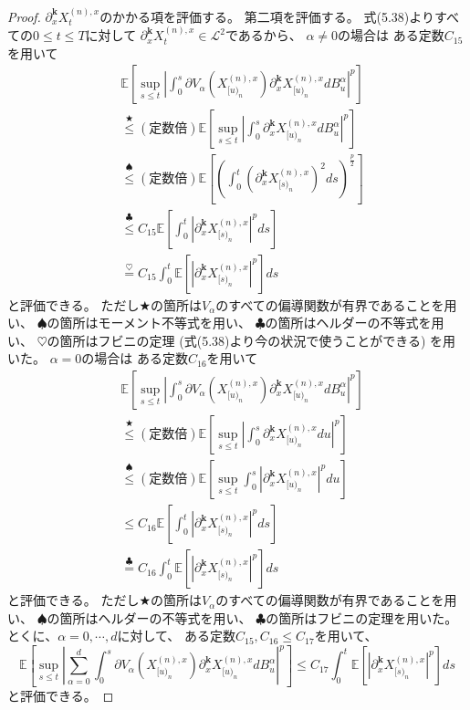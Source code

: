\documentclass[uplatex]{jsarticle}
\theoremstyle{definition}
\def\E{\mathbb{E}}
\def\mcL{\mathcal{L}}
\begin{document}
\begin{proof}
  \(\partial_x^{\mathbf{k}}X_t^{(n),x}\)のかかる項を評価する。
  第二項を評価する。
  式(5.38)よりすべての\(0\leq t\leq T\)に対して
  \(\partial_x^{\mathbf{k}}X_t^{(n),x}\in \mcL^2\)であるから、
  \(\alpha \neq 0\)の場合は
  ある定数\(C_{15}\)を用いて
  \begin{align*}
    &\E \left[\sup_{s\leq t} \left|
    \int_0^s\partial V_\alpha\left(X_{[u)_n}^{(n),x}\right)
    \partial_x^{\mathbf{k}}X_{[u)_n}^{(n),x} dB_u^\alpha
    \right|^p\right] \\
    &\overset{\bigstar}{\leq} (\text{定数倍}) \E \left[\sup_{s\leq t} \left|
    \int_0^s \partial_x^{\mathbf{k}}X_{[u)_n}^{(n),x} dB_u^\alpha
    \right|^p\right] \\
    &\overset{\spadesuit}{\leq} (\text{定数倍}) \E \left[\left(
    \int_0^t \left(\partial_x^{\mathbf{k}}X_{[s)_n}^{(n),x}\right)^2 ds
    \right)^{\frac{p}{2}}\right] \\
    &\overset{\clubsuit}{\leq} C_{15} \E \left[
    \int_0^t \left| \partial_x^{\mathbf{k}}X_{[s)_n}^{(n),x}\right|^p
    ds \right] \\
    &\overset{\heartsuit}{=} C_{15} \int_0^t \E \left[ \left|
    \partial_x^{\mathbf{k}}X_{[s)_n}^{(n),x}\right|^p \right] ds
  \end{align*}
  と評価できる。
  ただし\(\bigstar\)の箇所は\(V_\alpha\)のすべての偏導関数が有界であることを用い、
  \(\spadesuit\)の箇所はモーメント不等式を用い、
  \(\clubsuit\)の箇所はヘルダーの不等式を用い、
  \(\heartsuit\)の箇所はフビニの定理 (式(5.38)より今の状況で使うことができる) を用いた。
  \(\alpha = 0\)の場合は
  ある定数\(C_{16}\)を用いて
  \begin{align*}
    &\E \left[\sup_{s\leq t} \left|
    \int_0^s\partial V_\alpha\left(X_{[u)_n}^{(n),x}\right)
    \partial_x^{\mathbf{k}}X_{[u)_n}^{(n),x} dB_u^\alpha
    \right|^p\right] \\
    &\overset{\bigstar}{\leq} (\text{定数倍}) \E \left[\sup_{s\leq t} \left|
    \int_0^s \partial_x^{\mathbf{k}}X_{[u)_n}^{(n),x} du \right|^p\right] \\
    &\overset{\spadesuit}{\leq} (\text{定数倍}) \E \left[\sup_{s\leq t}
    \int_0^s \left| \partial_x^{\mathbf{k}}X_{[u)_n}^{(n),x}\right|^p du \right] \\
    &\leq C_{16} \E \left[
    \int_0^t \left| \partial_x^{\mathbf{k}}X_{[s)_n}^{(n),x}\right|^p ds \right] \\
    &\overset{\clubsuit}{=} C_{16} \int_0^t \E \left[ \left|
    \partial_x^{\mathbf{k}}X_{[s)_n}^{(n),x}\right|^p \right] ds
  \end{align*}
  と評価できる。
  ただし\(\bigstar\)の箇所は\(V_\alpha\)のすべての偏導関数が有界であることを用い、
  \(\spadesuit\)の箇所はヘルダーの不等式を用い、
  \(\clubsuit\)の箇所はフビニの定理を用いた。
  とくに、\(\alpha = 0,\cdots ,d\)に対して、
  ある定数\(C_{15},C_{16}\leq C_{17}\)を用いて、
  \[
  \E \left[\sup_{s\leq t} \left|
  \sum_{\alpha=0}^d \int_0^s\partial V_\alpha\left(X_{[u)_n}^{(n),x}\right)
  \partial_x^{\mathbf{k}}X_{[u)_n}^{(n),x} dB_u^\alpha
  \right|^p\right]
  \leq C_{17} \int_0^t \E \left[ \left|
  \partial_x^{\mathbf{k}}X_{[s)_n}^{(n),x}\right|^p \right] ds
  \]
  と評価できる。


\end{proof}
\end{document}
